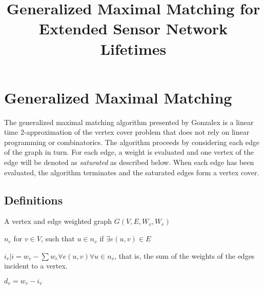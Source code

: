 


\title{Generalized Maximal Matching for Extended Sensor Network Lifetimes} 

\author{
}

\maketitle

\begin{abstract}

\end{abstract}
\section{Generalized Maximal Matching}
The generalized maximal matching algorithm presented by Gonzalex is a linear time 2-approximation of the vertex cover problem that does not rely on linear programming or combinatorics.\cite{Gonzalez1995129} The algorithm proceeds by considering each edge of the graph in turn. For each edge, a weight is evaluated and one vertex of the edge will be denoted as {\em saturated} as described below. When each edge has been evaluated, the algorithm terminates and the saturated edges form a vertex cover.

\subsection{Definitions}
\begin{description}
\item [Graph] A vertex and edge weighted graph $G(V,E,W_v, W_e)$
\item [Neighborhood] $n_e$ for $v\in V$, such that $u \in n_v$ if $\exists e(u,v) \in E$
\item [Incident Weight] $i_v | i = w_v - \sum w_e \forall e(u,v) \forall u \in n_v$, that is, the sum of the weights of the edges incident to a vertex.
\item [Incident Difference] $d_v = w_v - i_v$
\end{description}

